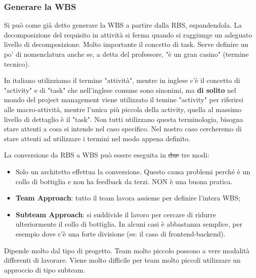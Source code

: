 \subsubsection{Generare la WBS}
Si può come già detto generare la WBS a partire dalla RBS, espandendola. La decomposizione del requisito in attività si ferma quando si raggiunge un adeguato livello di decomposizione.
Molto importante il concetto di task. Serve definire un po' di nomenclatura anche se, a detta del professore, "è un gran casino" (termine tecnico).
\begin{warn}[Terminologia]
	In italiano utilizziamo il termine "attività", mentre in inglese c'è il concetto di "activity" e di "task" che nell'inglese comune sono sinonimi, ma \textbf{di solito} nel mondo del project management viene utilizzato il temine "activity" per riferirsi alle macro-attività, mentre l'unica più piccola della activity, quella al massimo livello di dettaglio è il "task". Non tutti utilizzano questa terminologia, bisogna stare attenti a cosa si intende nel caso specifico. Nel nostro caso cercheremo di stare attenti ad utilizzare i termini nel modo appena definito.
\end{warn}
La conversione da RBS a WBS può essere eseguita in \st{due} tre modi:
\begin{itemize}
	\item Solo un architetto effettua la conversione. Questo causa problemi perché è un collo di bottiglia e non ha feedback da terzi. NON è una buona pratica.
	\item \textbf{Team Approach}: tutto il team lavora assieme per definire l'intera WBS;
	\item \textbf{Subteam Approach}: si suddivide il lavoro per cercare di ridurre ulteriormente il collo di bottiglia. In alcuni casi è abbastanza semplice, per esempio dove c'è una forte divisione (es: il caso di frontend-backend).
\end{itemize}
\begin{question}
	Dipende molto dal tipo di progetto. Team molto piccolo possono a vere modalità differenti di lavorare. Viene molto difficile per team molto piccoli utilizzare un approccio di tipo subteam.
\end{question}

